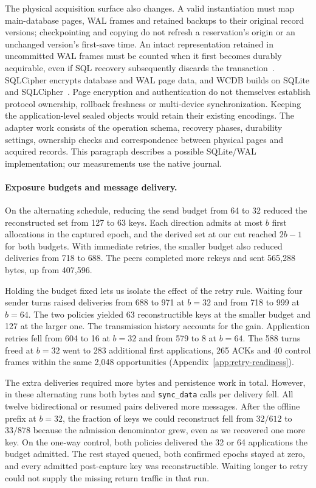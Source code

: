 The physical acquisition surface also changes. A valid instantiation must
map main-database pages, WAL frames and retained backups to their original
record versions; checkpointing and copying do not refresh a reservation's
origin or an unchanged version's first-save time. An intact representation
retained in uncommitted WAL frames must be counted when it first becomes
durably acquirable, even if SQL recovery subsequently discards the
transaction~\cite{sqliteWalInterface}. SQLCipher encrypts database and WAL
page data, and WCDB builds on SQLite and
SQLCipher~\cite{sqlcipherDesign,wcdb}. Page encryption and authentication do
not themselves establish protocol ownership, rollback freshness or
multi-device synchronization. Keeping the application-level sealed objects
would retain their existing encodings. The adapter work consists of the
operation schema, recovery phases, durability settings, ownership checks
and correspondence between physical pages and acquired records. This
paragraph describes a possible SQLite/WAL implementation; our measurements
use the native journal.

\paragraph{Exposure budgets and message delivery.}
On the alternating schedule, reducing the send budget from 64 to 32
reduced the reconstructed set from 127 to 63 keys. Each direction
admits at most $b$ first allocations in the captured epoch, and the
derived set at our cut reached $2b-1$ for both budgets. With immediate
retries, the smaller budget also reduced deliveries from 718 to 688.
The peers completed more rekeys and sent 565,288 bytes, up from 407,596.

Holding the budget fixed lets us isolate the effect of the retry
rule. Waiting four sender turns raised deliveries from 688 to 971 at
$b=32$ and from 718 to 999 at $b=64$. The two policies yielded 63
reconstructible keys at the smaller budget and 127 at the larger one.
The transmission history accounts for the gain. Application retries
fell from 604 to 16 at $b=32$ and from 579 to 8 at $b=64$. The 588
turns freed at $b=32$ went to 283 additional first applications, 265
ACKs and 40 control frames within the same 2,048 opportunities
(Appendix~\ref{app:retry-readiness}).

The extra deliveries required more bytes and persistence work in total.
However, in these alternating runs both bytes and \texttt{sync\_data} calls per
delivery fell. All twelve bidirectional or resumed pairs delivered more
messages. After the offline prefix at $b=32$, the fraction of keys we
could reconstruct fell from $32/612$ to $33/878$ because the admission
denominator grew, even as we recovered one more key. On the one-way
control, both policies delivered the 32 or 64 applications the budget
admitted.
The rest stayed queued, both confirmed epochs stayed at zero, and every
admitted post-capture key was reconstructible. Waiting longer to retry
could not supply the missing return traffic in that run.

